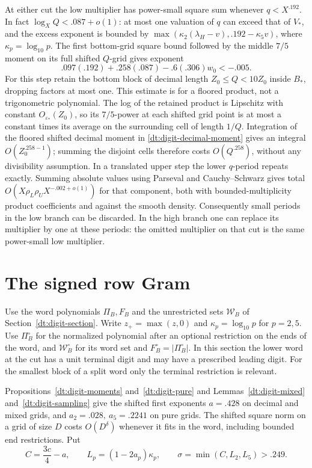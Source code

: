 \documentclass[11pt,a4paper]{article}
\theoremstyle{paperplain}
\numberwithin{equation}{section}
\begin{document}
At either cut the low multiplier has power-small square sum
whenever \(q<X^{.192}\). In fact \(\log_X Q<.087+o(1)\):
at most one valuation of \(q\) can exceed that of \(V_*\),
and the excess exponent is bounded by
\(\max(\kappa_2(\lambda_H-v),.192-\kappa_5v)\), where
\(\kappa_p=\log_{10}p\).
The first bottom-grid square bound followed by the middle
\(7/5\) moment on its full shifted \(Q\)-grid gives exponent
\[
 .097(.192)+.258(.087)-.6(.306)w_0<-.005 .
\]
For this step retain the bottom block of decimal length \(Z_0\le Q<10Z_0\)
inside \(B_*\), dropping factors at most one. This estimate is for a
floored product, not a trigonometric polynomial. The log of the retained
product is Lipschitz with constant \(O_{\varepsilon_*}(Z_0)\), so its
\(7/5\)-power at each shifted grid point is at most a constant times its
average on the surrounding cell of length \(1/Q\). Integration of the
floored shifted decimal moment in \eqref{dt:digit-decimal-moment} gives
an integral \(O(Z_0^{.258-1})\); summing the disjoint cells therefore
costs \(O(Q^{.258})\), without any divisibility assumption. In a translated upper step the
lower \(q\)-period repeats exactly. Summing absolute values using
Parseval and Cauchy--Schwarz gives total
\(O(X\rho_L\rho_U X^{-.002+o(1)})\) for that component, both
with bounded-multiplicity product coefficients and against the
smooth density. Consequently small periods in the low branch
can be discarded. In the high branch one can replace its
multiplier by one at these periods: the omitted multiplier on
that cut is the same power-small low multiplier.

\section{The signed row Gram}\label{dt:gram}

Use the word polynomials \(\Pi_B,F_B\) and the unrestricted
sets \(\mathcal W_B\) of Section~\ref{dt:digit-section}.
Write \(z_+=\max(z,0)\) and \(\kappa_p=\log_{10}p\) for \(p=2,5\).
Use \(\Pi_B^\circ\) for the normalized polynomial after an
optional restriction on the ends of the word, and
\(\mathcal W_B^\circ\) for its word set and
\(F_B^\circ=|\Pi_B^\circ|\). In this section the lower
word at the cut has a unit terminal digit and may have a
prescribed leading digit. For the smallest block of a split
word only the terminal restriction is relevant.

Propositions~\ref{dt:digit-moments} and~\ref{dt:digit-pure} and
Lemmas~\ref{dt:digit-mixed} and~\ref{dt:digit-sampling} give the
shifted first exponents \(a=.428\) on decimal and mixed grids,
and \(a_2=.028,\ a_5=.2241\) on pure grids. The shifted square
norm on a grid of size \(D\) costs \(O(D^\delta)\) whenever it fits
in the word, including bounded end restrictions. Put
\begin{equation}\label{dt:gram-coarse-exponents}
 C=\frac{3c}{4}-a,\qquad L_p=(1-2a_p)\kappa_p,\qquad
                     \sigma=\min(C,L_2,L_5)>.249.
\end{equation}
\end{document}
